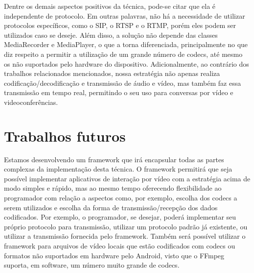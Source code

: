 \documentclass{acm_proc_article-sp}
\begin{document}
Dentre os demais aspectos positivos da técnica, pode-se citar que ela é independente de protocolo. Em outras palavras, não há a necessidade de utilizar protocolos específicos, como o SIP, o RTSP e o RTMP, porém eles podem ser utilizados caso se deseje. Além disso, a solução não depende das classes MediaRecorder e MediaPlayer, o que a torna diferenciada, principalmente no que diz respeito a permitir a utilização de um grande número de codecs, até mesmo os não suportados pelo hardware do dispositivo. Adicionalmente, ao contrário dos trabalhos relacionados mencionados, nossa estratégia não apenas realiza codificação/decodificação e transmissão de áudio e vídeo, mas também faz essa transmissão em tempo real, permitindo o seu uso para conversas por vídeo e videoconferências.

\section{Trabalhos futuros}

Estamos desenvolvendo um framework que irá encapsular todas as partes complexas da implementação desta técnica. O framework permitirá que seja possível implementar aplicativos de interação por vídeo com a estratégia acima de modo simples e rápido, mas ao mesmo tempo oferecendo flexibilidade ao programador com relação a aspectos como, por exemplo, escolha dos codecs a serem utilizados e escolha da forma de transmissão/recepção dos dados codificados. Por exemplo, o programador, se desejar, poderá implementar seu próprio protocolo para transmissão, utilizar um protocolo padrão já existente, ou utilizar a transmissão fornecida pelo framework. Também será possível utilizar o framework para arquivos de vídeo locais que estão codificados com codecs ou formatos não suportados em hardware pelo Android, visto que o FFmpeg suporta, em software, um número muito grande de codecs.

%

%
%
\balancecolumns
\end{document}
